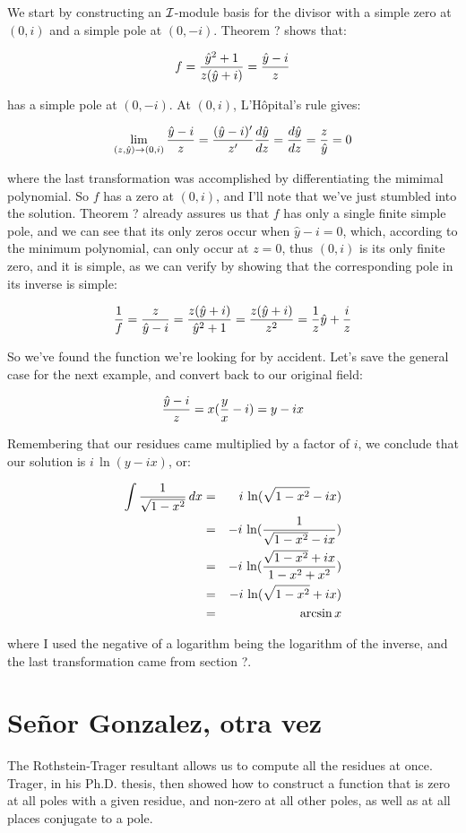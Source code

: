 We start by constructing an ${\cal I}$-module basis for the divisor
with a simple zero at $(0,i)$ and a simple pole at $(0,-i)$.  Theorem
? shows that:

$$f = {{\hat{y}^2+1}\over{z(\hat{y}+i)}} = {{\hat{y}-i}\over{z}} $$

has a simple pole at $(0,-i)$.  At $(0,i)$, L'H\^opital's rule gives:

$$ \lim_{(z,\hat{y})\to (0,i)} {{\hat{y}-i}\over{z}}
   = {{(\hat{y}-i)'}\over{z'}} {{d\hat{y}}\over{dz}} = {{d\hat{y}}\over{dz}} = {z\over\hat{y}} = 0 $$

where the last transformation was accomplished by differentiating the
mimimal polynomial.  So $f$ has a zero at $(0,i)$, and I'll
note that we've just stumbled into the solution.  Theorem ? already
assures us that $f$ has only a single finite simple pole,
and we can see that its only zeros occur when $\hat{y}-i=0$, which,
according to the minimum polynomial, can only occur at $z=0$, thus
$(0,i)$ is its only finite zero, and it is simple, as we can
verify by showing that the corresponding pole in its inverse is simple:

$$ {1\over f} = {z\over{\hat{y}-i}} = {{z(\hat{y}+i)}\over{\hat{y}^2+1}}
  = {{z(\hat{y}+i)}\over{z^2}} = {1\over z}\hat{y} + {i\over z} $$


So we've found the function we're looking for by accident.  Let's save the
general case for the next example, and convert back to
our original field:

$${{\hat{y}-i}\over{z}} = x({y\over x}-i) = y - ix $$

Remembering that our residues came multiplied by a factor of $i$, we
conclude that our solution is $i\,\ln(y-ix)$, or:

\begin{eqnarray*}
\int {1\over{\sqrt{1-x^2}}} \,dx &=& i\,\ln(\sqrt{1-x^2}-ix) \\
                                 &=& -i\,\ln({1\over{\sqrt{1-x^2}-ix}}) \\
                                 &=& -i\,\ln({{\sqrt{1-x^2}+ix}\over{1-x^2+x^2}}) \\
                                 &=& -i\,\ln({\sqrt{1-x^2}+ix}) \\
                                 &=& \arcsin x \\
\end{eqnarray*}

where I used the negative of a logarithm being the logarithm of
the inverse, and the last transformation came from section ?.


\endexample


\section{Se\~nor Gonzalez, otra vez}

The Rothstein-Trager resultant allows us to compute all the residues
at once.  Trager, in his Ph.D. thesis, then showed how to construct a
function that is zero at all poles with a given residue, and non-zero
at all other poles, as well as at all places conjugate to a pole.
